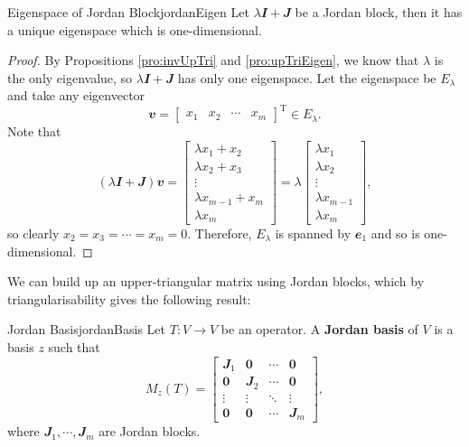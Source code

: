 \documentclass[math, code]{amznotes}
\theoremstyle{remark}
\newcommand{\zero}{\mathbf{0}}
\begin{document}
\begin{probox}{Eigenspace of Jordan Block}{jordanEigen}
    Let $\lambda\mathbfit{I} + \mathbfit{J}$ be a Jordan block, then it has a unique eigenspace which is one-dimensional.
    \tcblower
    \begin{proof}
        By Propositions \ref{pro:invUpTri} and \ref{pro:upTriEigen}, we know that $\lambda$ is the only eigenvalue, so $\lambda\mathbfit{I} + \mathbfit{J}$ has only one eigenspace. Let the eigenspace be $E_\lambda$ and take any eigenvector 
        \begin{equation*}
            \mathbfit{v} = \begin{bmatrix}
                x_1 & x_2 & \cdots & x_m
            \end{bmatrix}^{\mathrm{T}} \in E_\lambda.
        \end{equation*}
        Note that 
        \begin{equation*}
            (\lambda\mathbfit{I} + \mathbfit{J})\mathbfit{v} = \begin{bmatrix}
                \lambda x_1 + x_2 \\
                \lambda x_2 + x_3 \\
                \vdots \\
                \lambda x_{m - 1} + x_m \\
                \lambda x_m
            \end{bmatrix} = \lambda\begin{bmatrix}
                \lambda x_1 \\
                \lambda x_2 \\
                \vdots \\
                \lambda x_{m - 1} \\
                \lambda x_m
            \end{bmatrix},
        \end{equation*}
        so clearly $x_2 = x_3 = \cdots = x_m = 0$. Therefore, $E_\lambda$ is spanned by $\mathbfit{e}_1$ and so is one-dimensional.
    \end{proof}
\end{probox}
We can build up an upper-triangular matrix using Jordan blocks, which by triangularisability gives the following result:
\begin{dfnbox}{Jordan Basis}{jordanBasis}
    Let $T \colon V \to V$ be an operator. A {\color{red} \textbf{Jordan basis}} of $V$ is a basis $z$ such that 
    \begin{equation*}
        M_z(T) = \begin{bmatrix}
            \mathbfit{J}_1 & \zero & \cdots & \zero \\
            \zero & \mathbfit{J}_2 & \cdots & \zero \\
            \vdots & \vdots & \ddots & \vdots \\
            \zero & \zero & \cdots & \mathbfit{J}_m
        \end{bmatrix},
    \end{equation*}
    where $\mathbfit{J}_1, \cdots, \mathbfit{J}_m$ are Jordan blocks.
\end{dfnbox}
\end{document}
